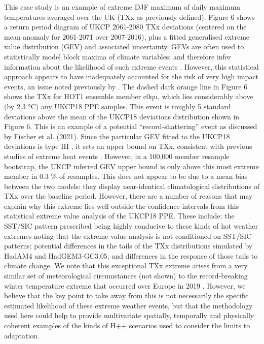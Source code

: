     This case study is an example of extreme DJF maximum of daily maximum temperatures averaged over the UK (TXx as previously defined). Figure 6 shows a return period diagram of UKCP 2061-2080 TXx deviations (centered on the mean anomaly for 2061-2071 over 2007-2016), plus a fitted generalised extreme value distribution (GEV) and associated uncertainty. GEVs are often used to statistically model block maxima of climate variables; and therefore infer information about the likelihood of such extreme events \citep{brown_climate_2014}. However, this statistical approach appears to have inadequately accounted for the risk of very high impact events, an issue noted previously by \citet{sippel_combining_2015}. The dashed dark orange line in Figure 6 shows the TXx for HOT1 ensemble member c0qu, which lies considerably above (by 2.3 °C) any UKCP18 PPE samples. This event is roughly 5 standard deviations above the mean of the UKCP18 deviations distribution shown in Figure 6. This is an example of a potential ``record-shattering'' event as discussed by Fischer et al. (2021). Since the particular GEV fitted to the UKCP18 deviations is type III \citep{coles_introduction_2001}, it sets an upper bound on TXx, consistent with previous studies of extreme heat events \citep{gessner_very_2021}. However, in a 100,000 member resample bootstrap, the UKCP inferred GEV upper bound is only above this most extreme member in 0.3 \% of resamples. This does not appear to be due to a mean bias between the two models: they display near-identical climatological distributions of TXx over the baseline period. However, there are a number of reasons that may explain why this extreme lies well outside the confidence intervals from this statistical extreme value analysis of the UKCP18 PPE. These include: the SST/SIC pattern prescribed being highly conducive to these kinds of hot weather extremes noting that the extreme value analysis is not conditioned on SST/SIC patterns; potential differences in the tails of the TXx distributions simulated by HadAM4 and HadGEM3-GC3.05; and differences in the response of those tails to climate change. We note that this exceptional TXx extreme arises from a very similar set of meteorological circumstances (not shown) to the record-breaking winter temperature extreme that occurred over Europe in 2019 \citep{kendon_temperature_2020,young_record-breaking_2020}. However, we believe that the key point to take away from this is not necessarily the specific estimated likelihood of these extreme weather events, but that the methodology used here could help to provide multivariate spatially, temporally and physically coherent examples of the kinds of H++ scenarios used to consider the limits to adaptation.


